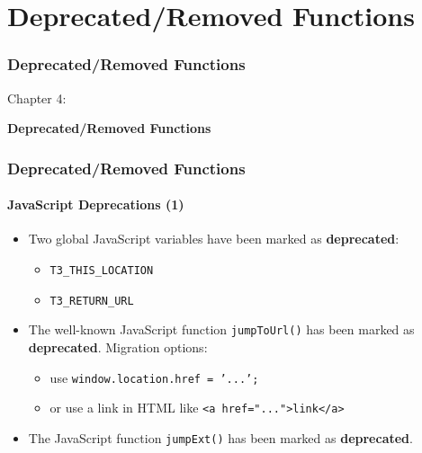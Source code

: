 %

\section{Deprecated/Removed Functions}
\begin{frame}[fragile]
	\frametitle{Deprecated/Removed Functions}

	\begin{center}\huge{Chapter 4:}\end{center}
	\begin{center}\huge{\color{typo3darkgrey}\textbf{Deprecated/Removed Functions}}\end{center}

\end{frame}


\begin{frame}[fragile]
	\frametitle{Deprecated/Removed Functions}
	\framesubtitle{JavaScript Deprecations (1)}

	\begin{itemize}
		\item Two global JavaScript variables have been marked as \textbf{deprecated}:

			\begin{itemize}
				\item \texttt{T3\_THIS\_LOCATION}
				\item \texttt{T3\_RETURN\_URL}
			\end{itemize}

		\item The well-known JavaScript function \texttt{jumpToUrl()} has been marked as \textbf{deprecated}.
			Migration options:

			\begin{itemize}
				\item use \texttt{window.location.href = '...';}
				\item or use a link in HTML like \texttt{<a href="...">link</a>}
			\end{itemize}

		\item The JavaScript function \texttt{jumpExt()} has been marked as \textbf{deprecated}.

	\end{itemize}

\end{frame}


